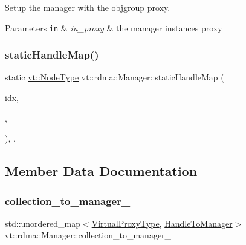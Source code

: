 Setup the manager with the objgroup proxy. 


\begin{DoxyParams}[1]{Parameters}
\mbox{\tt in}  & {\em in\+\_\+proxy} & the manager instance\textquotesingle{}s proxy \\
\hline
\end{DoxyParams}
\mbox{\label{structvt_1_1rdma_1_1_manager_a4a4972102f481ce6190cf8cf01a83cb8}} 
\subsubsection{\texorpdfstring{static\+Handle\+Map()}{staticHandleMap()}}
{\footnotesize\ttfamily static \hyperlink{namespacevt_a866da9d0efc19c0a1ce79e9e492f47e2}{vt\+::\+Node\+Type} vt\+::rdma\+::\+Manager\+::static\+Handle\+Map (\begin{DoxyParamCaption}\item[{\hyperlink{namespacevt_a3bab786053b74a3d856fff1412ffa73a}{vt\+::\+Index2D} $\ast$}]{idx,  }\item[{\hyperlink{namespacevt_a3bab786053b74a3d856fff1412ffa73a}{vt\+::\+Index2D} $\ast$}]{,  }\item[{\hyperlink{namespacevt_a866da9d0efc19c0a1ce79e9e492f47e2}{vt\+::\+Node\+Type}}]{ }\end{DoxyParamCaption})\hspace{0.3cm}{\ttfamily [inline]}, {\ttfamily [static]}, {\ttfamily [private]}}



\subsection{Member Data Documentation}
\mbox{\label{structvt_1_1rdma_1_1_manager_ae579c90339a37d953a57dc942ff5f6d1}} 
\subsubsection{\texorpdfstring{collection\+\_\+to\+\_\+manager\+\_\+}{collection\_to\_manager\_}}
{\footnotesize\ttfamily std\+::unordered\+\_\+map$<$\hyperlink{namespacevt_a1b417dd5d684f045bb58a0ede70045ac}{Virtual\+Proxy\+Type}, \hyperlink{structvt_1_1rdma_1_1_manager_aac6e7c58d320c302ea08461941d65f6e}{Handle\+To\+Manager}$>$ vt\+::rdma\+::\+Manager\+::collection\+\_\+to\+\_\+manager\+\_\+\hspace{0.3cm}{\ttfamily [private]}}



